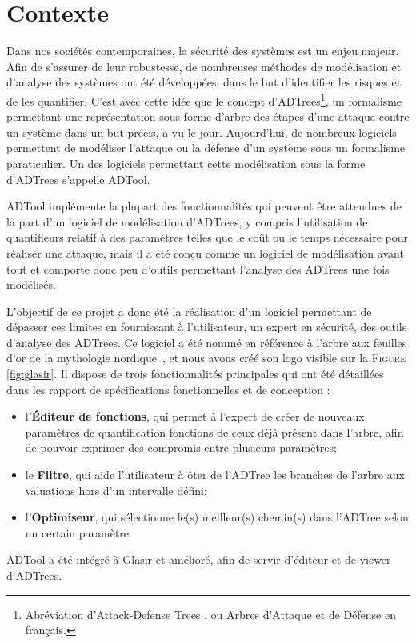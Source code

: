 \section{Contexte}
\label{Contexte}

    Dans nos sociétés contemporaines, la sécurité des systèmes est un enjeu majeur. Afin de s'assurer de leur robustesse, de nombreuses méthodes de modélisation et d'analyse des systèmes ont été développées, dans le but d'identifier les risques et de les quantifier. C'est avec cette idée que le concept d'ADTrees\footnote{Abréviation d'\og Attack-Defense Trees \fg{}, ou \og Arbres d'Attaque et de Défense\fg{} en français.}, un formalisme permettant une représentation sous forme d'arbre des étapes d'une attaque contre un système dans un but précis, a vu le jour. Aujourd'hui, de nombreux logiciels permettent de modéliser l'attaque ou la défense d'un système sous un formalisme paraticulier. Un des logiciels permettant cette modélisation sous la forme d'ADTrees s'appelle ADTool.

ADTool implémente la plupart des fonctionnalités qui peuvent être attendues de la part d'un logiciel de modélisation d'ADTrees, y compris l'utilisation de quantifieurs relatif à des paramètres telles que le coût ou le temps nécessaire pour réaliser une attaque, mais il a été conçu comme un logiciel de modélisation avant tout et comporte donc peu d'outils permettant l'analyse des ADTrees une fois modélisés. 

    L'objectif de ce projet a donc été la réalisation d'un logiciel permettant de dépasser ces limites en fournissant à l'utilisateur, un expert en sécurité, des outils d'analyse des ADTrees. Ce logiciel a été nommé \glasir{} en référence à l'arbre aux feuilles d'or de la mythologie nordique~\cite{vikingCulture}, et nous avons créé son logo visible sur la \textsc{Figure} \ref{fig:glasir}. Il dispose de trois fonctionnalités principales qui ont été détaillées dans les rapport de spécifications fonctionnelles et de conception :    
\begin{itemize}
    	\item l'{\bf Éditeur de fonctions}, qui permet à l'expert de créer de nouveaux paramètres de quantification fonctions de ceux déjà présent dans l'arbre, afin de pouvoir exprimer des compromis entre plusieurs paramètres;
    	\item le {\bf Filtre}, qui aide l'utilisateur à ôter de l'ADTree les branches de l'arbre aux valuations hors d'un intervalle défini;
    	\item l'{\bf Optimiseur}, qui sélectionne le(s) meilleur(s) chemin(s) dans l'ADTree selon un certain paramètre.
\end{itemize} 
ADTool a été intégré à Glasir et amélioré, afin de servir d'éditeur et de viewer d'ADTrees. 

